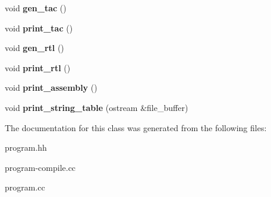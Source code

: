 \begin{DoxyCompactItemize}
$$\item 
\mbox{\label{classProgram_a475fd2320538f8e597bb9d849d0405f7}} 
void {\bfseries gen\+\_\+tac} ()
\item 
\mbox{\label{classProgram_a45c8d1320b806c2bdbb57fc3aa42074b}} 
void {\bfseries print\+\_\+tac} ()
\item 
\mbox{\label{classProgram_a5da38344307cd6b9e50759eec49cb37e}} 
void {\bfseries gen\+\_\+rtl} ()
\item 
\mbox{\label{classProgram_a482574e8722887856aa0f11d10bffe99}} 
void {\bfseries print\+\_\+rtl} ()
\item 
\mbox{\label{classProgram_aebdee93c2ea17e9c2a64a72782244f5b}} 
void {\bfseries print\+\_\+assembly} ()
\item 
\mbox{\label{classProgram_ad3d51e1f71725720471858c8c077cf1b}} 
void {\bfseries print\+\_\+string\+\_\+table} (ostream \&file\+\_\+buffer)
\end{DoxyCompactItemize}


The documentation for this class was generated from the following files\+:\begin{DoxyCompactItemize}
\item 
program.\+hh\item 
program-\/compile.\+cc\item 
program.\+cc\end{DoxyCompactItemize}
